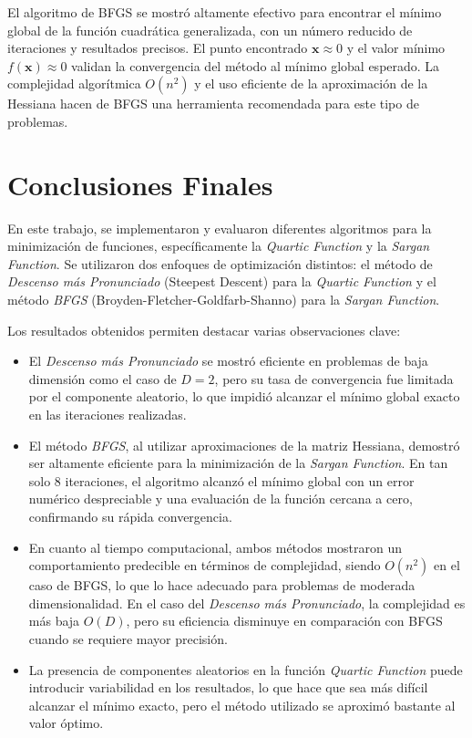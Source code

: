 \documentclass{article}
\begin{document}
	El algoritmo de BFGS se mostró altamente efectivo para encontrar el mínimo global de la función cuadrática generalizada, con un número reducido de iteraciones y resultados precisos. El punto encontrado $\mathbf{x} \approx 0$ y el valor mínimo $f(\mathbf{x}) \approx 0$ validan la convergencia del método al mínimo global esperado. La complejidad algorítmica $O(n^2)$ y el uso eficiente de la aproximación de la Hessiana hacen de BFGS una herramienta recomendada para este tipo de problemas.
	
	\section{Conclusiones Finales}
	
	En este trabajo, se implementaron y evaluaron diferentes algoritmos para la minimización de funciones, específicamente la \textit{Quartic Function} y la \textit{Sargan Function}. Se utilizaron dos enfoques de optimización distintos: el método de \textit{Descenso más Pronunciado} (Steepest Descent) para la \textit{Quartic Function} y el método \textit{BFGS} (Broyden-Fletcher-Goldfarb-Shanno) para la \textit{Sargan Function}.
	
	Los resultados obtenidos permiten destacar varias observaciones clave:
	
	\begin{itemize}
		\item El \textit{Descenso más Pronunciado} se mostró eficiente en problemas de baja dimensión como el caso de $D=2$, pero su tasa de convergencia fue limitada por el componente aleatorio, lo que impidió alcanzar el mínimo global exacto en las iteraciones realizadas.
		\item El método \textit{BFGS}, al utilizar aproximaciones de la matriz Hessiana, demostró ser altamente eficiente para la minimización de la \textit{Sargan Function}. En tan solo 8 iteraciones, el algoritmo alcanzó el mínimo global con un error numérico despreciable y una evaluación de la función cercana a cero, confirmando su rápida convergencia.
		\item En cuanto al tiempo computacional, ambos métodos mostraron un comportamiento predecible en términos de complejidad, siendo $O(n^2)$ en el caso de BFGS, lo que lo hace adecuado para problemas de moderada dimensionalidad. En el caso del \textit{Descenso más Pronunciado}, la complejidad es más baja $O(D)$, pero su eficiencia disminuye en comparación con BFGS cuando se requiere mayor precisión.
		\item La presencia de componentes aleatorios en la función \textit{Quartic Function} puede introducir variabilidad en los resultados, lo que hace que sea más difícil alcanzar el mínimo exacto, pero el método utilizado se aproximó bastante al valor óptimo.
	\end{itemize}
	
\end{document}
